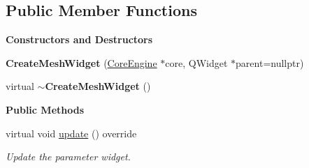 \subsection*{Public Member Functions}
\begin{Indent}\textbf{ Constructors and Destructors}\par
\begin{DoxyCompactItemize}
\item 
\mbox{\label{classrev_1_1_view_1_1_create_mesh_widget_a0d97e6ce95a3351a5be74fad830ba6b8}} 
{\bfseries Create\+Mesh\+Widget} (\mbox{\hyperlink{classrev_1_1_core_engine}{Core\+Engine}} $\ast$core, Q\+Widget $\ast$parent=nullptr)
\item 
\mbox{\label{classrev_1_1_view_1_1_create_mesh_widget_afd15aba2df1451e7b2b0c8070f6ab71a}} 
virtual {\bfseries $\sim$\+Create\+Mesh\+Widget} ()
\end{DoxyCompactItemize}
\end{Indent}
\begin{Indent}\textbf{ Public Methods}\par
\begin{DoxyCompactItemize}
\item 
\mbox{\label{classrev_1_1_view_1_1_create_mesh_widget_a05df3436a96e95189f8fad63dddff9c2}} 
virtual void \mbox{\hyperlink{classrev_1_1_view_1_1_create_mesh_widget_a05df3436a96e95189f8fad63dddff9c2}{update}} () override
\begin{DoxyCompactList}\small\item\em Update the parameter widget. \end{DoxyCompactList}\end{DoxyCompactItemize}
\end{Indent}
